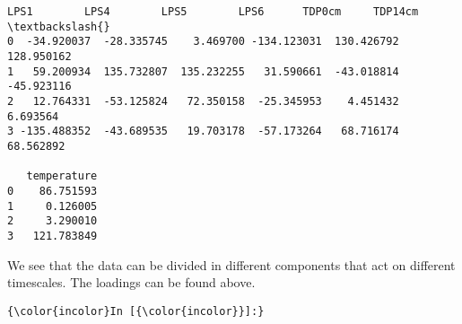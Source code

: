 \documentclass{article}
\begin{document}
    \begin{Verbatim}[commandchars=\\\{\}]
LPS1        LPS4        LPS5        LPS6      TDP0cm     TDP14cm  \textbackslash{}
0  -34.920037  -28.335745    3.469700 -134.123031  130.426792  128.950162   
1   59.200934  135.732807  135.232255   31.590661  -43.018814  -45.923116   
2   12.764331  -53.125824   72.350158  -25.345953    4.451432    6.693564   
3 -135.488352  -43.689535   19.703178  -57.173264   68.716174   68.562892   

   temperature  
0    86.751593  
1     0.126005  
2     3.290010  
3   121.783849
    \end{Verbatim}

    We see that the data can be divided in different components that act on
different timescales. The loadings can be found above.

    \begin{Verbatim}[commandchars=\\\{\}]
{\color{incolor}In [{\color{incolor}}]:} 
\end{Verbatim}


    
    
    
    
\end{document}
